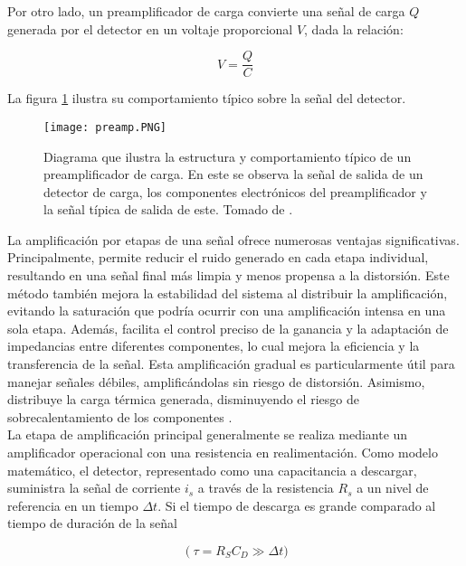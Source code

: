 \documentclass{report}
\begin{document}
\noindent Por otro lado, un preamplificador de carga convierte una señal de carga $Q$ generada por el detector en un voltaje proporcional $V$, dada la relación: 

\begin{equation}
    V = \frac{Q}{C}
\end{equation}

La figura \ref{fig:preamp} ilustra su comportamiento típico sobre la señal del detector.\\

\begin{figure}[H]
    \centering
    \texttt{[image: preamp.PNG]}
    \caption{Diagrama que ilustra la estructura y comportamiento típico de un preamplificador de carga. En este se observa la señal de salida de un detector de carga, los componentes electrónicos del preamplificador y la señal típica de salida de este. Tomado de \cite{kolanoski4}.}
    \label{fig:preamp}

\end{figure}

\noindent La amplificación por etapas de una señal ofrece numerosas ventajas significativas. Principalmente, permite reducir el ruido generado en cada etapa individual, resultando en una señal final más limpia y menos propensa a la distorsión. Este método también mejora la estabilidad del sistema al distribuir la amplificación, evitando la saturación que podría ocurrir con una amplificación intensa en una sola etapa. Además, facilita el control preciso de la ganancia y la adaptación de impedancias entre diferentes componentes, lo cual mejora la eficiencia y la transferencia de la señal. Esta amplificación gradual es particularmente útil para manejar señales débiles, amplificándolas sin riesgo de distorsión. Asimismo, distribuye la carga térmica generada, disminuyendo el riesgo de sobrecalentamiento de los componentes \cite{webster1}. \\

\noindent La etapa de amplificación principal generalmente se realiza mediante un amplificador operacional con una resistencia en realimentación. Como modelo matemático, el detector, representado como una capacitancia a descargar, suministra la señal de corriente $i_{s}$ a través de la resistencia $R_{s}$ a un nivel de referencia en un tiempo $\Delta t$. Si el tiempo de descarga es grande comparado al tiempo de duración de la señal 

\begin{equation}
    \left(\tau=R_S C_D \gg\right. \Delta t)
\end{equation}
\end{document}
